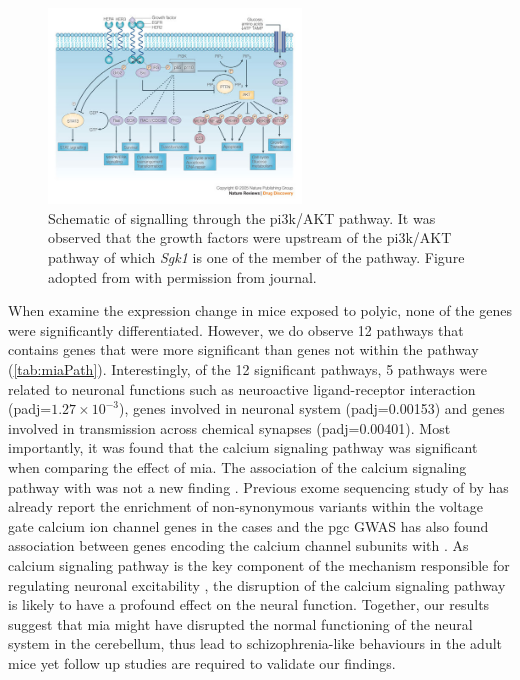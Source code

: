 \begin{figure}
	\centering
	\includegraphics[width=0.6\textwidth]{figure/omega/pi3ksignaling.jpg}
	\caption[Schematic of signalling through the PI3K/AKT pathway]{
		Schematic of signalling through the \gls{pi3k}/AKT pathway.
		It was observed that the growth factors were upstream of the \gls{pi3k}/AKT pathway of which \textit{Sgk1} is one of the member of the pathway.
		Figure adopted from \citet{Hennessy2005} with permission from journal.
	}\label{fig:pi3kPathway}
\end{figure}
When examine the expression change in mice exposed to \gls{polyic}, none of the genes were significantly differentiated. 
However, we do observe 12 pathways that contains genes that were more significant than genes not within the pathway (\cref{tab:miaPath}).
Interestingly, of the 12 significant pathways, 5 pathways were related to neuronal functions such as neuroactive ligand-receptor interaction (padj=$1.27\times 10^{-3}$), genes involved in neuronal system (padj=0.00153) and genes involved in transmission across chemical synapses (padj=0.00401).
Most importantly, it was found that the calcium signaling pathway was significant when comparing the effect of \gls{mia}. 
The association of the calcium signaling pathway with  was not a new finding \citep{Lidow2003,Purcell2014,Ripke2014}.
Previous exome sequencing study of  by \citet{Purcell2014} has already report the enrichment of non-synonymous variants within the voltage gate calcium ion channel genes in the  cases and the \gls{pgc}  \gls{GWAS} has also found association between genes encoding the calcium channel subunits with .
As calcium signaling pathway is the key component of the mechanism responsible for regulating neuronal excitability \citep{Berridge2014}, the disruption of the calcium signaling pathway is likely to have a profound effect on the neural function. 
Together, our results suggest that \gls{mia} might have disrupted the normal functioning of the neural system in the cerebellum, thus lead to schizophrenia-like behaviours in the adult mice yet follow up studies are required to validate our findings.

